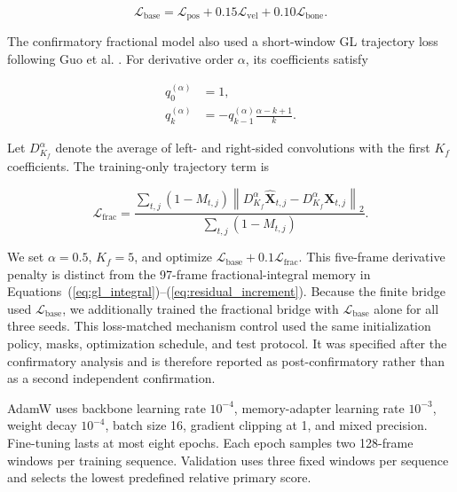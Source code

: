 \documentclass[fractalfract,article,submit,moreauthors,pdftex]{Definitions/mdpi}
\begin{document}
\begin{linenomath}
\begin{equation}
\mathcal{L}_{\mathrm{base}}=\mathcal{L}_{\mathrm{pos}}+0.15\mathcal{L}_{\mathrm{vel}}+0.10\mathcal{L}_{\mathrm{bone}}.
\label{eq:base_loss}
\end{equation}
\end{linenomath}

The confirmatory fractional model also used a short-window GL trajectory loss following Guo et al. \cite{guo2026fotsr}. For derivative order $\alpha$, its coefficients satisfy

\begin{linenomath}
\begin{align}
q^{(\alpha)}_0&=1,\\
q^{(\alpha)}_k&=-q^{(\alpha)}_{k-1}\frac{\alpha-k+1}{k}.
\label{eq:gl_difference}
\end{align}
\end{linenomath}

Let $D^{\alpha}_{K_f}$ denote the average of left- and right-sided convolutions with the first $K_f$ coefficients. The training-only trajectory term is

\begin{linenomath}
\begin{equation}
\mathcal{L}_{\mathrm{frac}}=
\frac{\sum_{t,j}(1-M_{t,j})
\left\|D^{\alpha}_{K_f}\widehat{\mathbf{X}}_{t,j}
-D^{\alpha}_{K_f}\mathbf{X}_{t,j}\right\|_2}
{\sum_{t,j}(1-M_{t,j})}.
\label{eq:fractional_loss}
\end{equation}
\end{linenomath}

We set $\alpha=0.5$, $K_f=5$, and optimize $\mathcal{L}_{\mathrm{base}}+0.1\mathcal{L}_{\mathrm{frac}}$. This five-frame derivative penalty is distinct from the 97-frame fractional-integral memory in Equations~(\ref{eq:gl_integral})--(\ref{eq:residual_increment}). Because the finite bridge used $\mathcal{L}_{\mathrm{base}}$, we additionally trained the fractional bridge with $\mathcal{L}_{\mathrm{base}}$ alone for all three seeds. This loss-matched mechanism control used the same initialization policy, masks, optimization schedule, and test protocol. It was specified after the confirmatory analysis and is therefore reported as post-confirmatory rather than as a second independent confirmation.

AdamW \cite{loshchilov2019adamw} uses backbone learning rate $10^{-4}$, memory-adapter learning rate $10^{-3}$, weight decay $10^{-4}$, batch size 16, gradient clipping at 1, and mixed precision. Fine-tuning lasts at most eight epochs. Each epoch samples two 128-frame windows per training sequence. Validation uses three fixed windows per sequence and selects the lowest predefined relative primary score.
\end{document}
